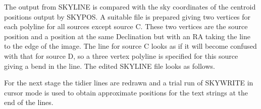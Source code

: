 \documentclass[twoside,11pt]{starlink}
\begin{document}
The output from SKYLINE is compared with the sky coordinates of the centroid
positions output by SKYPOS. A suitable file is prepared giving two vertices
for each polyline for all sources except source C. These two vertices are the
source position and a position at the same Declination but with an RA taking
the line to the edge of the image. The line for source C looks as if it will
become confused with that for source D, so a three vertex polyline is specified
for this source giving a bend in the line. The edited SKYLINE file looks as
follows.
\begin{small}
\end{small}
For the next stage the tidier lines are redrawn and a trial run of SKYWRITE in
cursor mode is used to obtain approximate positions for the text strings at the
end of the lines.
\end{document}
